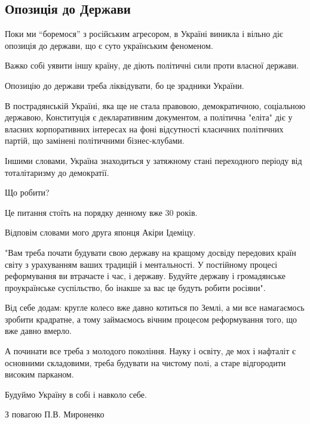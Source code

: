  
 
 
 
 
\subsection{Опозиція до Держави}

Поки ми \enquote{боремося} з російським агресором, в Україні виникла і вільно діє
опозиція до держави, що є суто українським феноменом.

Важко собі уявити іншу країну, де діють політичні сили проти власної держави.

Опозицію до держави треба ліквідувати, бо це зрадники України.

В пострадянській Україні, яка ще не стала правовою, демократичною, соціальною
державою, Конституція є декларативним документом, а політична "еліта" діє у
власних корпоративних інтересах на фоні відсутності класичних політичних
партій, що замінені політичними бізнес-клубами.

Іншими словами, Україна знаходиться у затяжному стані переходного періоду від
тоталітаризму до демократії.

Що робити?

Це питання стоїть на порядку денному вже 30 років.

Відповім словами мого друга японця Акіри Ідеміцу.

"Вам треба почати будувати свою державу на кращому досвіду передових країн
світу з урахуванням ваших традицій і ментальності. У постійному процесі
реформування ви втрачаєте і час, і державу. Будуйте державу і громадянське
проукраїнське суспільство, бо інакше за вас це будуть робити росіяни".

Від себе додам: кругле колесо вже давно котиться по Землі, а ми все намагаємось
зробити крадратне, а тому займаємось вічним процесом реформування того, що вже
давно вмерло.

А починати все треба з молодого покоління. Науку і освіту, де мох і нафталіт є
основними складовими, треба будувати на чистому полі, а старе відгородити
високим парканом.

Будуймо Україну в собі і навколо себе.

З повагою П.В. Мироненко
